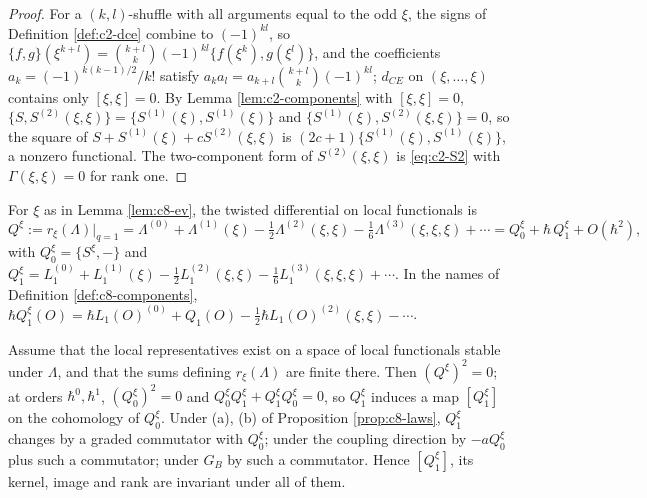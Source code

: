 \begin{proof}
For a $(k,l)$-shuffle with all arguments equal to the odd $\xi$, the signs of Definition \ref{def:c2-dce} combine to $(-1)^{kl}$, so $\{f,g\}(\xi^{k+l})=\binom{k+l}{k}(-1)^{kl}\{f(\xi^k),g(\xi^l)\}$, and the coefficients $a_k=(-1)^{k(k-1)/2}/k!$ satisfy $a_ka_l=a_{k+l}\binom{k+l}{k}(-1)^{kl}$; $d_{CE}$ on $(\xi,\dots,\xi)$ contains only $[\xi,\xi]=0$. By Lemma \ref{lem:c2-components} with $[\xi,\xi]=0$, $\{S,S^{(2)}(\xi,\xi)\}=\{S^{(1)}(\xi),S^{(1)}(\xi)\}$ and $\{S^{(1)}(\xi),S^{(2)}(\xi,\xi)\}=0$, so the square of $S+S^{(1)}(\xi)+cS^{(2)}(\xi,\xi)$ is $(2c+1)\{S^{(1)}(\xi),S^{(1)}(\xi)\}$, a nonzero functional. The two-component form of $S^{(2)}(\xi,\xi)$ is \eqref{eq:c2-S2} with $\Gamma(\xi,\xi)=0$ for rank one.
\end{proof}

\begin{definition}
\label{def:c8-twisted}
For $\xi$ as in Lemma \ref{lem:c8-ev}, the twisted differential on local functionals is
\[
Q^\xi:=r_\xi(\Lambda)\big|_{q=1}=\Lambda^{(0)}+\Lambda^{(1)}(\xi)-\tfrac12\Lambda^{(2)}(\xi,\xi)-\tfrac16\Lambda^{(3)}(\xi,\xi,\xi)+\cdots=Q^\xi_0+\hbar\,Q^\xi_1+O(\hbar^2),
\]
with $Q^\xi_0=\{S^\xi,-\}$ and $Q^\xi_1=L_1^{(0)}+L_1^{(1)}(\xi)-\tfrac12L_1^{(2)}(\xi,\xi)-\tfrac16L_1^{(3)}(\xi,\xi,\xi)+\cdots$. In the names of Definition \ref{def:c8-components}, $\hbar Q^\xi_1(O)=\hbar L_1(O)^{(0)}+Q_1(O)-\tfrac12\hbar L_1(O)^{(2)}(\xi,\xi)-\cdots$.
\end{definition}

\begin{theorem}
\label{thm:c8-twist}
Assume that the local representatives exist on a space of local functionals stable under $\Lambda$, and that the sums defining $r_\xi(\Lambda)$ are finite there. Then $(Q^\xi)^2=0$; at orders $\hbar^0,\hbar^1$, $(Q^\xi_0)^2=0$ and $Q^\xi_0Q^\xi_1+Q^\xi_1Q^\xi_0=0$, so $Q^\xi_1$ induces a map $[Q^\xi_1]$ on the cohomology of $Q^\xi_0$. Under (a), (b) of Proposition \ref{prop:c8-laws}, $Q^\xi_1$ changes by a graded commutator with $Q^\xi_0$; under the coupling direction by $-aQ^\xi_0$ plus such a commutator; under $G_B$ by such a commutator. Hence $[Q^\xi_1]$, its kernel, image and rank are invariant under all of them.
\end{theorem}

